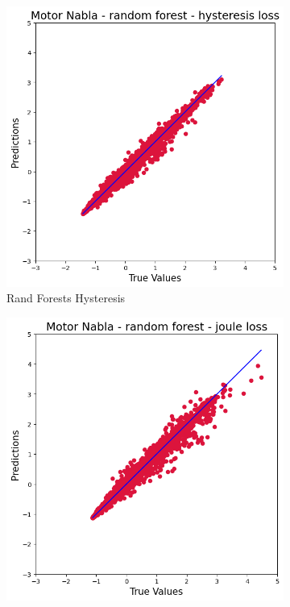 \documentclass{article}
\begin{document}
\begin{figure}[!htbp]
    \vspace{0.3cm}
    
    \begin{subfigure}[b]{0.23\textwidth}
        \centering
        \includegraphics[width=\textwidth]{images/Nabla/rand_for_hysteresis.png}
        \caption{Rand Forests Hysteresis}
    \end{subfigure}
    \hfill
    \begin{subfigure}[b]{0.23\textwidth}
        \centering
        \includegraphics[width=\textwidth]{images/Nabla/rand_for_joule.png}

\end{subfigure}
\end{figure}
\end{document}
